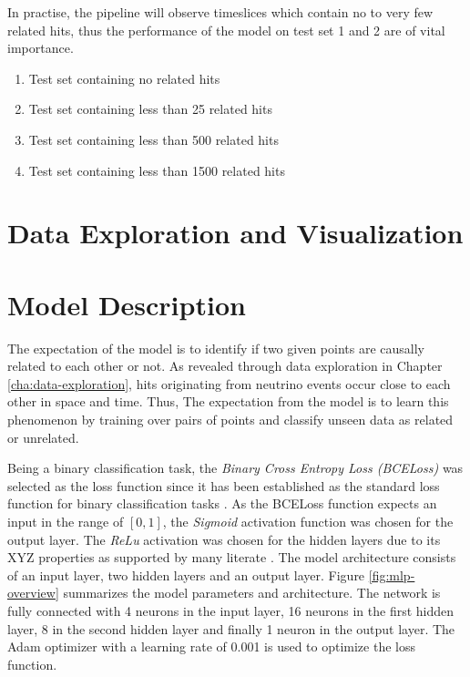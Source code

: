 In practise, the pipeline will observe timeslices which contain no to
very few related hits, thus the performance of the model on test set
1 and 2 are of vital importance.

\begin{enumerate}
\item Test set containing no related hits
\item Test set containing less than 25 related hits
\item Test set containing less than 500 related hits
\item Test set containing less than 1500 related hits
\end{enumerate}

\section{Data Exploration and Visualization}

\section{Model Description}
\label{sec:pm-mpdel-desc}

The expectation of the model is to identify if two given points are
causally related to each other or not. As revealed through data
exploration in Chapter \ref{cha:data-exploration}, hits originating from
neutrino events occur close to each other in space and time. Thus, The
expectation from the model is to learn this phenomenon by training
over pairs of points and classify unseen data as related or unrelated.

Being a binary classification task, the \textit{Binary Cross Entropy
  Loss (BCELoss)} was selected as the loss function since it has been
established as the standard loss function for binary classification
tasks \cite{CITEME}. As the BCELoss function expects an input in the
range of $[0, 1]$, the \textit{Sigmoid} activation function was chosen
for the output layer. The \textit{ReLu} activation was chosen for the
hidden layers due to its XYZ properties as supported by many literate
\cite{CITME}. The model architecture consists of an input layer, two
hidden layers and an output layer. Figure \ref{fig:mlp-overview}
summarizes the model parameters and architecture. The network is fully
connected with 4 neurons in the input layer, 16 neurons in the first
hidden layer, 8 in the second hidden layer and finally 1 neuron in the
output layer. The Adam optimizer with a learning rate of 0.001 is used
to optimize the loss function.

